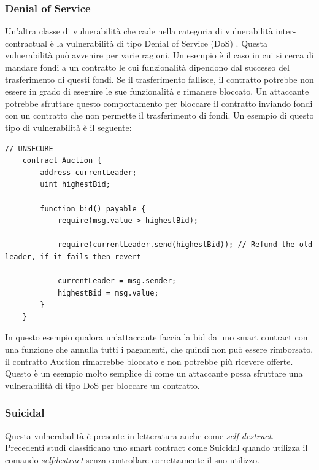 \documentclass[../../Thesis.tex]{subfiles}
\begin{document}
\subsubsection{Denial of Service}
Un'altra classe di vulnerabilit\`a che cade nella categoria di vulnerabilit\`a inter-contractual \`e la vulnerabilit\`a di tipo Denial of Service (DoS) \cite{sc-vulnerabilities}. Questa vulnerabilit\`a pu\`o avvenire per varie ragioni.
Un esempio \`e il caso in cui si cerca di mandare fondi a un contratto le cui funzionalit\`a dipendono dal successo del trasferimento di questi fondi. Se il trasferimento fallisce, il contratto potrebbe non essere in grado di eseguire le sue funzionalit\`a e rimanere bloccato. Un attaccante potrebbe sfruttare questo comportamento per bloccare il contratto inviando fondi con un contratto che non permette il trasferimento di fondi. Un esempio di questo tipo di vulnerabilit\`a \`e il seguente:

\begin{lstlisting}[language=Solidity]
    // UNSECURE
    contract Auction {
        address currentLeader;
        uint highestBid;
    
        function bid() payable {
            require(msg.value > highestBid);
    
            require(currentLeader.send(highestBid)); // Refund the old leader, if it fails then revert
    
            currentLeader = msg.sender;
            highestBid = msg.value;
        }
    }
\end{lstlisting}
In questo esempio qualora un'attaccante faccia la bid da uno smart contract con una funzione che annulla tutti i pagamenti, che quindi non pu\`o essere rimborsato, il contratto Auction rimarrebbe bloccato e non potrebbe pi\`u ricevere offerte. Questo \`e un esempio molto semplice di come un attaccante possa sfruttare una vulnerabilit\`a di tipo DoS per bloccare un contratto. 

\subsubsection{Suicidal}
Questa vulnerabulit\`a \`e presente in letteratura anche come \emph{self-destruct}. Precedenti studi \cite{Suicidal} classificano uno smart contract come Suicidal quando utilizza il comando \emph{selfdestruct} senza controllare correttamente il suo utilizzo. 
\end{document}
